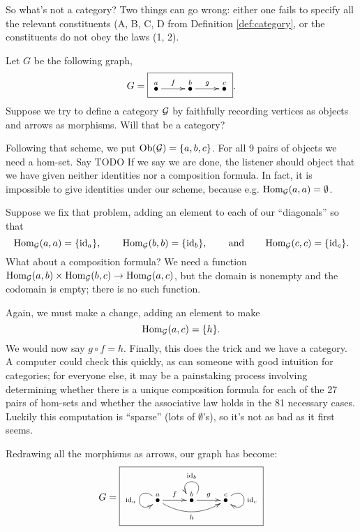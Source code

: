 \documentclass[CT4S-EN-RU]{subfiles}
\begin{document}
\begin{exampleENG}
So what's not a category? Two things can go wrong: either one fails to specify all the relevant constituents (A, B, C, D from Definition \ref{def:category}, or the constituents do not obey the laws (1, 2).

Let $G$ be the following graph,
$$G=\fbox{\xymatrix{\LMO{a}\ar[r]^f&\LMO{b}\ar[r]^g&\LMO{c}}}.$$
Suppose we try to define a category $\mathcal{G}$ by faithfully recording vertices as objects and arrows as morphisms. Will that be a category?

Following that scheme, we put $\textnormal{Ob}(\mathcal{G})=\{a,b,c\}$. For all 9 pairs of objects we need a hom-set.
Say 
TODO%
If we say we are done, the listener should object that we have given neither identities nor a composition formula. In fact, it is impossible to give identities under our scheme, because e.g. $\textnormal{Hom}_\mathcal{G}(a,a)=\emptyset$.

Suppose we fix that problem, adding an element to each of our “diagonals” so that 
$$\textnormal{Hom}_\mathcal{G}(a,a)=\{\textnormal{id}_a\},\hspace{.3in}\textnormal{Hom}_\mathcal{G}(b,b)=\{\textnormal{id}_b\},\hspace{.3in}\textnormal{and}\hspace{.3in}\textnormal{Hom}_\mathcal{G}(c,c)=\{\textnormal{id}_c\}.$$ What about a composition formula? We need a function $\textnormal{Hom}_\mathcal{G}(a,b)\times\textnormal{Hom}_\mathcal{G}(b,c)\rightarrow\textnormal{Hom}_\mathcal{G}(a,c)$, but the domain is nonempty and the codomain is empty; there is no such function. 

Again, we must make a change, adding an element to make $$\textnormal{Hom}_\mathcal{G}(a,c)=\{h\}.$$ We would now say $g\circ f=h$. Finally, this does the trick and we have a category. A computer could check this quickly, as can someone with good intuition for categories; for everyone else, it may be a painstaking process involving determining whether there is a unique composition formula for each of the 27 pairs of hom-sets and whether the associative law holds in the 81 necessary cases. Luckily this computation is “sparse” (lots of $\emptyset$'s), so it's not as bad as it first seems.

Redrawing all the morphisms as arrows, our graph has become:
$$G=\fbox{\xymatrix{\LMO{a}\ar@(ul,dl)[]_{\id_a}\ar[r]^f\ar@/_1pc/[rr]_h&\LMO{b}\ar@(ur,ul)[]_{\id_b}\ar[r]^g&\LMO{c}\ar@(ur,dr)[]^{\id_c}}}$$
\end{exampleENG}

\begin{exampleRUS}
\end{exampleRUS}
\end{document}
